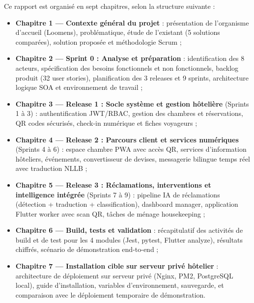 Ce rapport est organisé en sept chapitres, selon la structure suivante :

\begin{itemize}
  \item \textbf{Chapitre 1 — Contexte général du projet} : présentation de l'organisme d'accueil (Loomens), problématique, étude de l'existant (5 solutions comparées), solution proposée et méthodologie Scrum ;
  \item \textbf{Chapitre 2 — Sprint 0 : Analyse et préparation} : identification des 8 acteurs, spécification des besoins fonctionnels et non fonctionnels, backlog produit (32 user stories), planification des 3 releases et 9 sprints, architecture logique SOA et environnement de travail ;
  \item \textbf{Chapitre 3 — Release 1 : Socle système et gestion hôtelière} (Sprints 1 à 3) : authentification JWT/RBAC, gestion des chambres et réservations, QR codes sécurisés, check-in numérique et fiches voyageurs ;
  \item \textbf{Chapitre 4 — Release 2 : Parcours client et services numériques} (Sprints 4 à 6) : espace chambre PWA avec accès QR, services d'information hôteliers, événements, convertisseur de devises, messagerie bilingue temps réel avec traduction NLLB ;
  \item \textbf{Chapitre 5 — Release 3 : Réclamations, interventions et intelligence intégrée} (Sprints 7 à 9) : pipeline IA de réclamations (détection + traduction + classification), dashboard manager, application Flutter worker avec scan QR, tâches de ménage housekeeping ;
  \item \textbf{Chapitre 6 — Build, tests et validation} : récapitulatif des activités de build et de test pour les 4 modules (Jest, pytest, Flutter analyze), résultats chiffrés, scénario de démonstration end-to-end ;
  \item \textbf{Chapitre 7 — Installation cible sur serveur privé hôtelier} : architecture de déploiement sur serveur privé (Nginx, PM2, PostgreSQL local), guide d'installation, variables d'environnement, sauvegarde, et comparaison avec le déploiement temporaire de démonstration.
\end{itemize}
